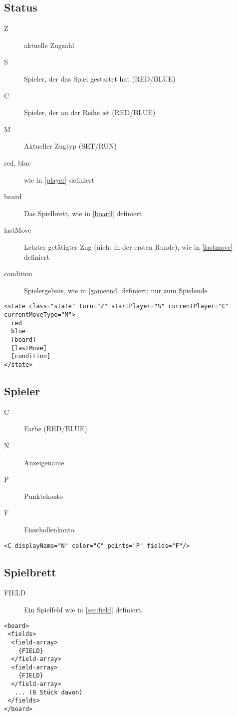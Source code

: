 \documentclass[12pt,a4paper, ngerman, oneside]{scrartcl}
\begin{document}
\subsection{\label{state}Status}
\begin{description}
\item[Z] aktuelle Zugzahl
\item[S] Spieler, der das Spiel gestartet hat (RED/BLUE)
\item[C] Spieler, der an der Reihe ist (RED/BLUE)
\item[M] Aktueller Zugtyp (SET/RUN)
\item[red, blue] wie in \ref{player} definiert
\item[board] Das Spielbrett, wie in \ref{board} definiert
\item[lastMove] Letzter getätigter Zug (nicht in der ersten Runde), wie in
\ref{lastmove} definiert
\item[condition] Spielergebnis, wie in \ref{gameend} definiert; nur zum Spielende
\end{description}
\begin{verbatim}
<state class="state" turn="Z" startPlayer="S" currentPlayer="C" currentMoveType="M">
  red
  blue
  [board]
  [lastMove]
  [condition]
</state>

\end{verbatim}

\subsection{\label{player}Spieler}
\begin{description}
\item[C] Farbe (RED/BLUE)
\item[N] Anzeigename
\item[P] Punktekonto
\item[F] Eisschollenkonto
\end{description}
\begin{verbatim}
<C displayName="N" color="C" points="P" fields="F"/>
\end{verbatim}


\subsection{\label{board}Spielbrett}
\begin{description}
\item[FIELD] Ein Spielfeld wie in \ref{sec:field} definiert.
\end{description}
\begin{verbatim}
<board>
 <fields>
  <field-array>
 	{FIELD}
  </field-array>
  <field-array>
 	{FIELD}
  </field-array>
   ... (8 Stück davon)
 </fields>
</board>
\end{verbatim}
\end{document}
